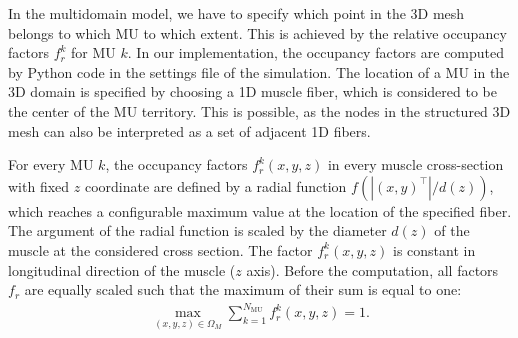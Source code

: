 In the multidomain model, we have to specify which point in the 3D mesh belongs to which MU to which extent. This is achieved by the relative occupancy factors $f_r^{k}$ for MU $k$.
In our implementation, the occupancy factors are computed by Python code in the settings file of the simulation.
The location of a MU in the 3D domain is specified by choosing a 1D muscle fiber, which is considered to be the center of the MU territory. This is possible, as the nodes in the structured 3D mesh can also be interpreted as a set of adjacent 1D fibers.

For every MU $k$, the occupancy factors $f_r^k(x,y,z)$ in every muscle cross-section with fixed $z$ coordinate are defined by a radial function $f(|(x,y)^\top|/d(z))$, which reaches a configurable maximum value at the location of the specified fiber. The argument of the radial function is scaled by the diameter $d(z)$ of the muscle at the considered cross section. The factor $f_r^k(x,y,z)$ is constant in longitudinal direction of the muscle ($z$ axis). Before the computation, all factors $f_r$ are equally scaled such that the maximum of their sum is equal to one:%
\begin{align*}
  \max\limits_{(x,y,z)\in\Omega_M} \sum_{k=1}^{N_\text{MU}} f_r^k(x,y,z) = 1.
\end{align*}

